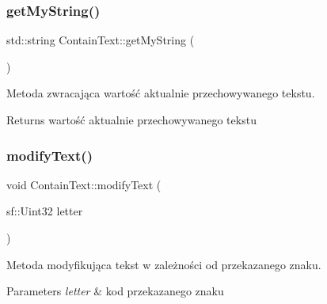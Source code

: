 \subsubsection{\texorpdfstring{getMyString()}{getMyString()}}
{\footnotesize\ttfamily std\+::string Contain\+Text\+::get\+My\+String (\begin{DoxyParamCaption}{ }\end{DoxyParamCaption})\hspace{0.3cm}{\ttfamily [inline]}}



Metoda zwracająca wartość aktualnie przechowywanego tekstu. 

\begin{DoxyReturn}{Returns}
wartość aktualnie przechowywanego tekstu 
\end{DoxyReturn}
\mbox{\label{class_contain_text_a2b6f106829ba9f0d709f503515669214}} 
\subsubsection{\texorpdfstring{modifyText()}{modifyText()}}
{\footnotesize\ttfamily void Contain\+Text\+::modify\+Text (\begin{DoxyParamCaption}\item[{sf\+::\+Uint32}]{letter }\end{DoxyParamCaption})}



Metoda modyfikująca tekst w zależności od przekazanego znaku. 


\begin{DoxyParams}{Parameters}
{\em letter} & kod przekazanego znaku \\
\hline
\end{DoxyParams}
\mbox{\label{class_contain_text_a305522a9f8616b7702f917d72c53e5df}} 
